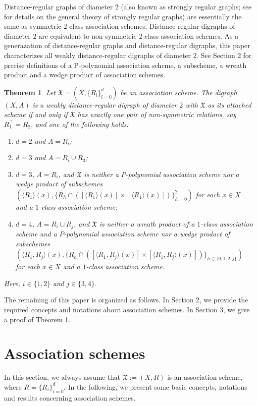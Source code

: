 \documentclass[12pt,a4paper]{amsart}
\newtheorem{thm}{Theorem}[section]
\theoremstyle{definition}
\begin{document}
Distance-regular graphs of diameter $2$ (also known as strongly regular graphs; see \cite{AEB98,AEB22,PJ99,CG01,JJ79} for details on the general theory of strongly regular graphs) are essentially the same as symmetric $2$-class association schemes. Distance-regular digraphs of diameter $2$ are equivalent to non-symmetric $2$-class association schemes. As a generazation of distance-regular graphs and distance-regular digraphs, this paper characterizes all weakly distance-regular digraphs of diameter $2$. See Section 2 for precise definitions of a P-polynomial association scheme, a subscheme, a wreath product and a wedge product of association schemes.

\begin{thm}\label{th1}
Let $\mathfrak{X}=(X,\{R_{l}\}_{l=0}^{d})$ be an association scheme. The digraph $(X,A)$ is a weakly distance-regular digraph of diameter $2$ with $\mathfrak{X}$ as its attached scheme if and only if $\mathfrak{X}$ has exactly one pair of non-symmetric relations, say $R_1^{\top}=R_2$, and one of the following holds:
\begin{enumerate}
\item\label{th1-1} $d=2$ and $A=R_i$;
		
\item\label{th1-3} $d=3$ and $A=R_i\cup R_3$;
		
\item\label{th1-2} $d=3$, $A=R_i$, and $\mathfrak{X}$ is neither a $P$-polynomial association scheme nor a wedge product of subschemes $(\langle R_1\rangle(x),\{R_h\cap([\langle R_1\rangle(x)]\times [\langle R_1\rangle(x)])\}_{h=0}^2)$ for each $x\in X$ and a $1$-class association scheme;
		
\item\label{th1-4} $d=4$, $A=R_i\cup R_j$, and $\mathfrak{X}$ is neither a wreath product of a $1$-class association scheme and a $P$-polynomial association scheme nor a wedge product of subschemes $(\langle R_1,R_j\rangle(x),\{R_h\cap([\langle R_1,R_j\rangle(x)]\times [\langle R_1,R_j\rangle(x)])\}_{h\in \{0,1,2,j\}})$ for each $x\in X$ and a $1$-class association scheme.
\end{enumerate}
Here, $i\in\{1,2\}$ and $j\in\{3,4\}$.
\end{thm}
The remaining of this paper is organized as follows. In Section 2, we provide the required concepts and notations about association schemes. In Section 3, we give a proof of Theorem \ref{th1}.

\section{Association schemes}
In this section, we always assume that $\mathfrak{X}:=(X,R)$ is an association scheme, where $R=\{R_{i}\}_{i=0}^{d}$. In the following, we present some basic concepts, notations and results concerning association schemes.
\end{document}
